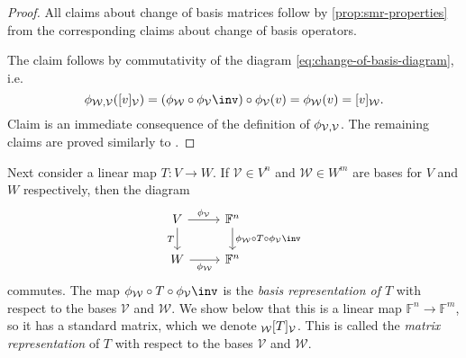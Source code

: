 \documentclass[article, a4paper, 11pt, oneside]{memoir}
\numberwithin{equation}{chapter}
\newcommand{\calV}{\mathcal{V}}
\newcommand{\calW}{\mathcal{W}}
\newcommand{\field}{\mathbb{F}}
\begin{document}
\begin{proof}
    All claims about change of basis matrices follow by \cref{prop:smr-properties} from the corresponding claims about change of basis operators.

    The claim  follows by commutativity of the diagram \cref{eq:change-of-basis-diagram}, i.e.
    \begin{equation*}
        \basischange{\calW}{\calV} (\coordvec{v}{\calV})
            = (\coordmap{\calW} \circ \coordmap{\calV}\inv) \circ \coordmap{\calV}(v)
            = \coordmap{\calW}(v)
            = \coordvec{v}{\calW}.
    \end{equation*}
    Claim  is an immediate consequence of the definition of $\basischange{\calV}{\calV}$. The remaining claims are proved similarly to .
\end{proof}

Next consider a linear map $T \colon V \to W$. If $\calV \in V^n$ and $\calW \in W^m$ are bases for $V$ and $W$ respectively, then the diagram
%
\begin{equation*}
    \begin{tikzcd}
        V
            \ar[d, "T", swap]
            \ar[r, "\coordmap{\calV}"]
        & \field^n
            \ar[d, "\coordmap{\calW} \circ T \circ \coordmap{\calV}\inv"] \\
        W
            \ar[r, "\coordmap{\calW}", swap]
        & \field^n
    \end{tikzcd}
\end{equation*}
%
commutes. The map $\coordmap{\calW} \circ T \circ \coordmap{\calV}\inv$ is the \emph{basis representation of $T$} with respect to the bases $\calV$ and $\calW$. We show below that this is a linear map $\field^n \to \field^m$, so it has a standard matrix, which we denote $\mr{\calW}{T}{\calV}$. This is called the \emph{matrix representation} of $T$ with respect to the bases $\calV$ and $\calW$.
\end{document}
